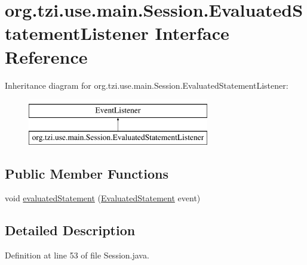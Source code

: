\hypertarget{interfaceorg_1_1tzi_1_1use_1_1main_1_1_session_1_1_evaluated_statement_listener}{\section{org.\-tzi.\-use.\-main.\-Session.\-Evaluated\-Statement\-Listener Interface Reference}
\label{interfaceorg_1_1tzi_1_1use_1_1main_1_1_session_1_1_evaluated_statement_listener}
}
Inheritance diagram for org.\-tzi.\-use.\-main.\-Session.\-Evaluated\-Statement\-Listener\-:\begin{figure}[H]
\begin{center}
\leavevmode
\includegraphics[height=2.000000cm]{interfaceorg_1_1tzi_1_1use_1_1main_1_1_session_1_1_evaluated_statement_listener}
\end{center}
\end{figure}
\subsection*{Public Member Functions}
\begin{DoxyCompactItemize}
\item 
void \hyperlink{interfaceorg_1_1tzi_1_1use_1_1main_1_1_session_1_1_evaluated_statement_listener_afa53c9b186565ee2aac7c601fdf0a5b4}{evaluated\-Statement} (\hyperlink{classorg_1_1tzi_1_1use_1_1main_1_1_session_1_1_evaluated_statement}{Evaluated\-Statement} event)
\end{DoxyCompactItemize}


\subsection{Detailed Description}


Definition at line 53 of file Session.\-java.



